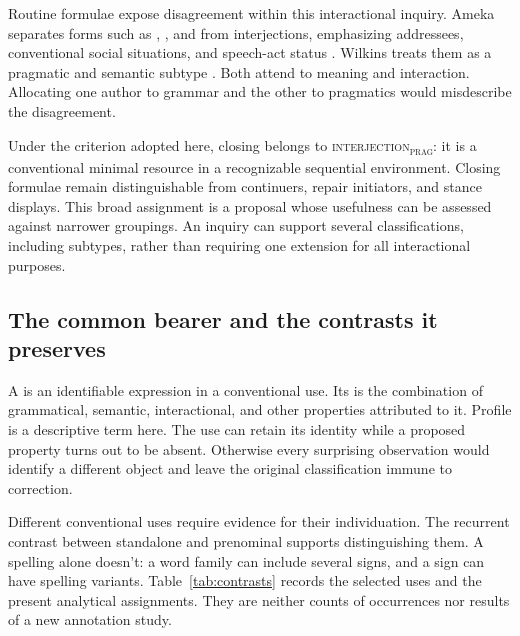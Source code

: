 \documentclass[12pt]{article}
\newcommand{\intj}[1]{\textsc{interjection\textsubscript{#1}}}
\begin{document}
Routine formulae expose disagreement within this interactional inquiry.
Ameka separates forms such as , , and
 from interjections, emphasizing addressees, conventional
social situations, and speech-act status \citep[108--110]{ameka1992}.
Wilkins treats them as a pragmatic and semantic subtype
\citep[142]{wilkins1992}. Both attend to meaning and interaction. Allocating
one author to grammar and the other to pragmatics would misdescribe the
disagreement.

Under the criterion adopted here, closing  belongs to
\intj{prag}: it is a conventional minimal resource in a recognizable
sequential environment. Closing formulae remain distinguishable from
continuers, repair initiators, and stance displays. This broad assignment
is a proposal whose usefulness can be assessed against narrower groupings.
An inquiry can support several classifications, including subtypes, rather
than requiring one extension for all interactional purposes.

\subsection{The common bearer and the contrasts it preserves}

A  is an identifiable expression in a conventional use.
Its  is the combination of grammatical, semantic, interactional,
and other properties attributed to it. Profile is a descriptive term here.
The use can retain its identity while a proposed property turns out to be
absent. Otherwise every surprising observation would identify a different
object and leave the original classification immune to correction.

Different conventional uses require evidence for their individuation.
The recurrent contrast between standalone and prenominal 
supports distinguishing them. A spelling alone doesn't: a word family can
include several signs, and a sign can have spelling variants. Table~\ref{tab:contrasts}
records the selected uses and the present analytical assignments. They are
neither counts of occurrences nor results of a new annotation study.
\end{document}
